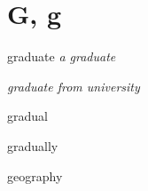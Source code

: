 \section{G, g}

\begin{DefWord}{graduate}
    \textit{a graduate}

    \textit{graduate from university}
\end{DefWord}

\begin{DefWord}{gradual}
\end{DefWord}

\begin{DefWord}{gradually}
\end{DefWord}

\begin{DefWord}{geography}
\end{DefWord}
